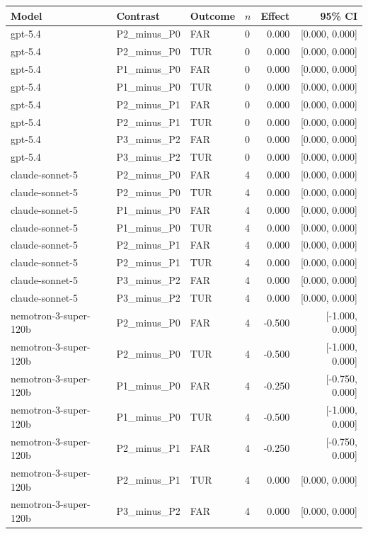 \begin{tabular}{llllrr}
\toprule
Model & Contrast & Outcome & $n$ & Effect & 95\% CI \\
\midrule
gpt-5.4 & P2\_minus\_P0 & FAR & 0 & 0.000 & [0.000, 0.000] \\
gpt-5.4 & P2\_minus\_P0 & TUR & 0 & 0.000 & [0.000, 0.000] \\
gpt-5.4 & P1\_minus\_P0 & FAR & 0 & 0.000 & [0.000, 0.000] \\
gpt-5.4 & P1\_minus\_P0 & TUR & 0 & 0.000 & [0.000, 0.000] \\
gpt-5.4 & P2\_minus\_P1 & FAR & 0 & 0.000 & [0.000, 0.000] \\
gpt-5.4 & P2\_minus\_P1 & TUR & 0 & 0.000 & [0.000, 0.000] \\
gpt-5.4 & P3\_minus\_P2 & FAR & 0 & 0.000 & [0.000, 0.000] \\
gpt-5.4 & P3\_minus\_P2 & TUR & 0 & 0.000 & [0.000, 0.000] \\
claude-sonnet-5 & P2\_minus\_P0 & FAR & 4 & 0.000 & [0.000, 0.000] \\
claude-sonnet-5 & P2\_minus\_P0 & TUR & 4 & 0.000 & [0.000, 0.000] \\
claude-sonnet-5 & P1\_minus\_P0 & FAR & 4 & 0.000 & [0.000, 0.000] \\
claude-sonnet-5 & P1\_minus\_P0 & TUR & 4 & 0.000 & [0.000, 0.000] \\
claude-sonnet-5 & P2\_minus\_P1 & FAR & 4 & 0.000 & [0.000, 0.000] \\
claude-sonnet-5 & P2\_minus\_P1 & TUR & 4 & 0.000 & [0.000, 0.000] \\
claude-sonnet-5 & P3\_minus\_P2 & FAR & 4 & 0.000 & [0.000, 0.000] \\
claude-sonnet-5 & P3\_minus\_P2 & TUR & 4 & 0.000 & [0.000, 0.000] \\
nemotron-3-super-120b & P2\_minus\_P0 & FAR & 4 & -0.500 & [-1.000, 0.000] \\
nemotron-3-super-120b & P2\_minus\_P0 & TUR & 4 & -0.500 & [-1.000, 0.000] \\
nemotron-3-super-120b & P1\_minus\_P0 & FAR & 4 & -0.250 & [-0.750, 0.000] \\
nemotron-3-super-120b & P1\_minus\_P0 & TUR & 4 & -0.500 & [-1.000, 0.000] \\
nemotron-3-super-120b & P2\_minus\_P1 & FAR & 4 & -0.250 & [-0.750, 0.000] \\
nemotron-3-super-120b & P2\_minus\_P1 & TUR & 4 & 0.000 & [0.000, 0.000] \\
nemotron-3-super-120b & P3\_minus\_P2 & FAR & 4 & 0.000 & [0.000, 0.000] \\

\end{tabular}
